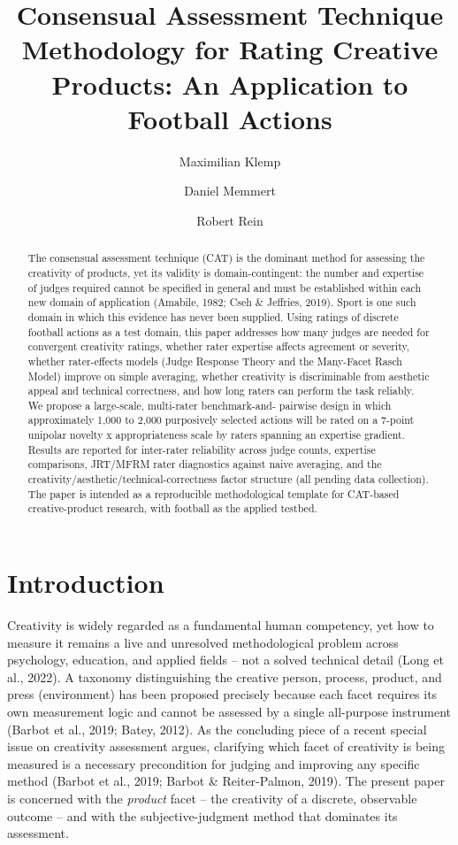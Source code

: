 \documentclass[
  12pt,
]{article}
\title{Consensual Assessment Technique Methodology for Rating Creative
Products: An Application to Football Actions}
\author[1*]{Maximilian Klemp}
\author[1]{Daniel Memmert}
\author[1]{Robert Rein}
\affil[1]{Institute of Exercise Training and Sport Informatics, German
Sport University Cologne}
\affil[*]{Corresponding Author, m.klemp@dshs-koeln.de}
\date{}
\begin{document}
\maketitle
\begin{abstract}
The consensual assessment technique (CAT) is the dominant method for
assessing the creativity of products, yet its validity is
domain-contingent: the number and expertise of judges required cannot be
specified in general and must be established within each new domain of
application (Amabile, 1982; Cseh \& Jeffries, 2019). Sport is one such
domain in which this evidence has never been supplied. Using ratings of
discrete football actions as a test domain, this paper addresses how
many judges are needed for convergent creativity ratings, whether rater
expertise affects agreement or severity, whether rater-effects models
(Judge Response Theory and the Many-Facet Rasch Model) improve on simple
averaging, whether creativity is discriminable from aesthetic appeal and
technical correctness, and how long raters can perform the task
reliably. We propose a large-scale, multi-rater benchmark-and- pairwise
design in which approximately 1,000 to 2,000 purposively selected
actions will be rated on a 7-point unipolar novelty x appropriateness
scale by raters spanning an expertise gradient. Results are reported for
inter-rater reliability across judge counts, expertise comparisons,
JRT/MFRM rater diagnostics against naive averaging, and the
creativity/aesthetic/technical-correctness factor structure (all pending
data collection). The paper is intended as a reproducible methodological
template for CAT-based creative-product research, with football as the
applied testbed.
\end{abstract}

\newpage{}


\section{Introduction}\label{introduction}

Creativity is widely regarded as a fundamental human competency, yet how
to measure it remains a live and unresolved methodological problem
across psychology, education, and applied fields -- not a solved
technical detail (Long et al., 2022). A taxonomy distinguishing the
creative person, process, product, and press (environment) has been
proposed precisely because each facet requires its own measurement logic
and cannot be assessed by a single all-purpose instrument (Barbot et
al., 2019; Batey, 2012). As the concluding piece of a recent special
issue on creativity assessment argues, clarifying which facet of
creativity is being measured is a necessary precondition for judging and
improving any specific method (Barbot et al., 2019; Barbot \&
Reiter-Palmon, 2019). The present paper is concerned with the
\emph{product} facet -- the creativity of a discrete, observable outcome
-- and with the subjective-judgment method that dominates its
assessment.
\end{document}
